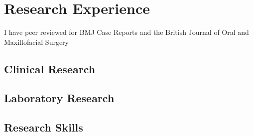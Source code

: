 \section*{Research Experience}

I have peer reviewed for BMJ Case Reports and the British Journal of Oral and Maxillofacial Surgery

\subsection*{Clinical Research}

\subsection*{Laboratory Research}

\subsection*{Research Skills}

